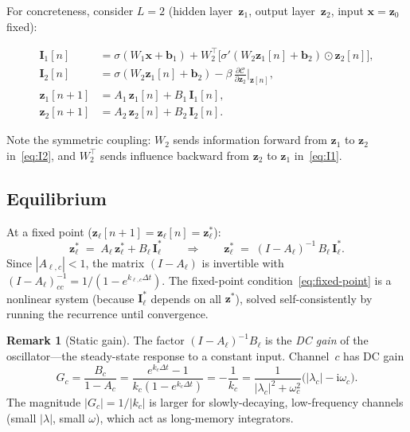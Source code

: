 \documentclass[11pt]{article}
\newcommand{\im}{\mathrm{i}}
\newcommand{\dt}{\Delta t}
\theoremstyle{definition}
\newtheorem{remark}{Remark}
\begin{document}
For concreteness, consider $L=2$ (hidden layer~$\bm{z}_1$, output
layer~$\bm{z}_2$, input $\bm{x}=\bm{z}_0$ fixed):

\begin{align}
  \bm{I}_1[n] &= \sigma(W_1\bm{x}+\bm{b}_1)
    + W_2^{\!\top}\bigl[\sigma'(W_2\bm{z}_1[n]+\bm{b}_2)
      \odot\bm{z}_2[n]\bigr],
    \label{eq:I1}\\[4pt]
  \bm{I}_2[n] &= \sigma(W_2\bm{z}_1[n]+\bm{b}_2)
    - \beta\,\frac{\partial\mathcal{C}}{\partial\bm{z}_2}\bigg|_{\bm{z}[n]},
    \label{eq:I2}\\[6pt]
  \bm{z}_1[n+1] &= A_1\,\bm{z}_1[n] + B_1\,\bm{I}_1[n],
    \label{eq:z1}\\
  \bm{z}_2[n+1] &= A_2\,\bm{z}_2[n] + B_2\,\bm{I}_2[n].
    \label{eq:z2}
\end{align}

Note the symmetric coupling:  $W_2$ sends information forward from
$\bm{z}_1$ to $\bm{z}_2$ in~\eqref{eq:I2}, and $W_2^{\!\top}$ sends
influence backward from $\bm{z}_2$ to $\bm{z}_1$ in~\eqref{eq:I1}.

\subsection{Equilibrium}

At a fixed point ($\bm{z}_\ell[n+1]=\bm{z}_\ell[n]=\bm{z}_\ell^*$):
\begin{equation}\label{eq:fixed-point}
  \bm{z}_\ell^*
  \;=\;
  A_\ell\,\bm{z}_\ell^*+B_\ell\,\bm{I}_\ell^*
  \qquad\Longrightarrow\qquad
  \bm{z}_\ell^*
  \;=\;
  (I-A_\ell)^{-1}\,B_\ell\,\bm{I}_\ell^*.
\end{equation}
Since $|A_{\ell,c}|<1$, the matrix $(I-A_\ell)$ is invertible with
$(I-A_\ell)^{-1}_{cc} = 1/(1-e^{k_{\ell,c}\dt})$.  The fixed-point
condition~\eqref{eq:fixed-point} is a nonlinear system (because
$\bm{I}_\ell^*$ depends on all $\bm{z}^*$), solved self-consistently
by running the recurrence until convergence.

\begin{remark}[Static gain]
The factor $(I-A_\ell)^{-1}B_\ell$ is the \emph{DC gain} of the
oscillator---the steady-state response to a constant input.
Channel~$c$ has DC gain
\[
  G_c = \frac{B_c}{1-A_c}
  = \frac{e^{k_c\dt}-1}{k_c(1-e^{k_c\dt})}
  = -\frac{1}{k_c}
  = \frac{1}{|\lambda_c|^2+\omega_c^2}
    \bigl(|\lambda_c|-\im\omega_c\bigr).
\]
The magnitude $|G_c|=1/|k_c|$ is larger for slowly-decaying,
low-frequency channels (small $|\lambda|$, small $\omega$),
which act as long-memory integrators.
\end{remark}
\end{document}
